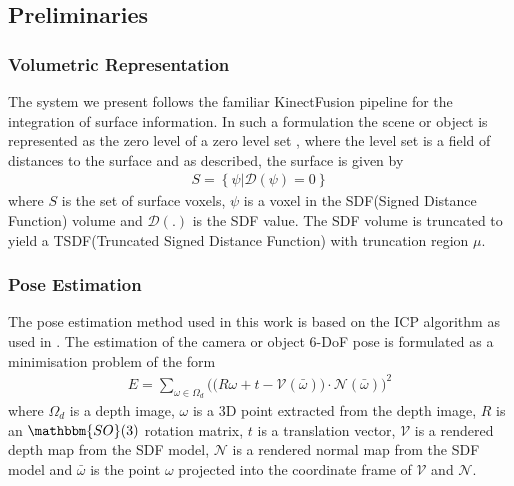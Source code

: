 \subsection{Preliminaries}
\subsubsection{Volumetric Representation}
The system we present follows the familiar KinectFusion \cite{Newcombe2011} pipeline for the integration of surface information. In such a 
formulation the scene or object is represented as the zero level of a zero level set \cite{Curless1996}, where the level set is a field of distances 
to the surface and as described, the surface is given by
\begin{equation}
\begin{split}
S = \left\{\psi | \mathcal{D}(\psi) = 0\right\}
\end{split}
\end{equation}
where $S$ is the set of surface voxels, $\psi$ is a voxel in the SDF(Signed Distance Function) volume and $\mathcal{D}(.)$ is the SDF value. 
The SDF volume is truncated to yield a TSDF(Truncated Signed Distance Function) with truncation region $\mu$.

\subsubsection{Pose Estimation}
The pose estimation method used in this work is based on the ICP algorithm as used in \cite{Newcombe2011, Prisacariu2014}. The estimation of 
the camera or object 6-DoF pose is formulated as a minimisation problem of the form
\begin{equation}
\begin{split}
E = \sum_{\omega \in \Omega_{d}} \bigg( \big( R\omega + t - \mathcal{V}(\bar{\omega}) \big) \cdot \mathcal{N}(\bar{\omega}) \bigg)^{2}
\end{split}
\end{equation}
where $\Omega_{d}$ is a depth image, $\omega$ is a 3D point extracted from the depth image, $R$ is an  $\mathbbm{SO}(3)$ 
rotation matrix, $t$ is a translation vector, $\mathcal{V}$ is a rendered depth map from the SDF model, $\mathcal{N}$ is a rendered 
normal map from the SDF model and $\bar{\omega}$ is the point $\omega$ projected into the coordinate frame of $\mathcal{V}$ and 
$\mathcal{N}$.

